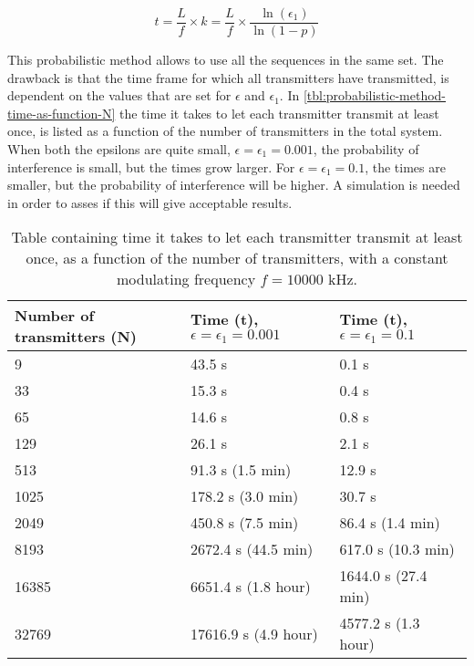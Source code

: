 \begin{equation}
	\label{eq:time-for-probabilistic-txs}
	t = \frac{L}{f} \times k = \frac{L}{f} \times \frac{\ln(\epsilon_1)}{\ln(1 - p)}
\end{equation}

This probabilistic method allows to use all the sequences in the same set.
The drawback is that the time frame for which all transmitters have transmitted, is dependent on the values that are set for $\epsilon$ and $\epsilon_1$.
In \autoref{tbl:probabilistic-method-time-as-function-N} the time it takes to let each transmitter transmit at least once, is listed as a function of the number of transmitters in the total system. 
When both the epsilons are quite small, $\epsilon = \epsilon_1 = 0.001$, the probability of interference is small, but the times grow larger.
For $\epsilon = \epsilon_1 = 0.1$, the times are smaller, but the probability of interference will be higher.
A simulation is needed in order to asses if this will give acceptable results.



\begin{table}[t]
	\centering
	\begin{tabular}{  | l | l | l | }

		\hline
		Number of transmitters (N)	& Time (t), $\epsilon = \epsilon_1 = 0.001$	& Time (t), $\epsilon = \epsilon_1 = 0.1$		\\ \hline

		9							& 43.5 s									& 0.1 s 										\\ \hline
		33							& 15.3 s									& 0.4 s											\\ \hline
		65							& 14.6 s									& 0.8 s											\\ \hline
		129							& 26.1 s									& 2.1 s											\\ \hline
		513							& 91.3 s (1.5 min)							& 12.9 s										\\ \hline
		1025						& 178.2 s	(3.0 min)						& 30.7 s										\\ \hline
		2049						& 450.8 s	(7.5 min)						& 86.4 s (1.4 min)								\\ \hline
		8193						& 2672.4 s (44.5 min)						& 617.0 s (10.3 min)							\\ \hline
		16385						& 6651.4 s (1.8 hour)						& 1644.0 s (27.4 min)							\\ \hline
		32769						& 17616.9 s (4.9 hour)						& 4577.2 s (1.3 hour)							\\ \hline


	\end{tabular}
	\caption{Table containing time it takes to let each transmitter transmit at least once, as a function of the number of transmitters, with a constant modulating frequency $f = 10000$ kHz.}
	\label{tbl:probabilistic-method-time-as-function-N}
\end{table}

